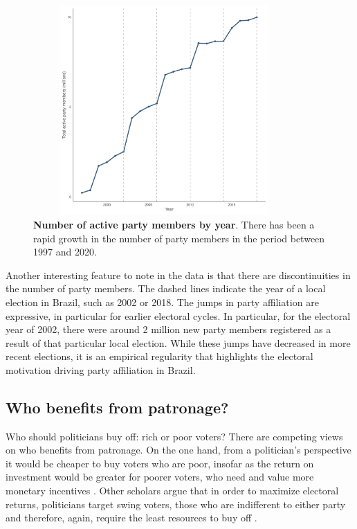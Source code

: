 \documentclass[12pt,a4paper]{article}
\begin{document}
\begin{figure}[H]
    \centering
    \includegraphics[width = 10cm, height = 8cm]{figures/partisanship/plot_partisan_by_year.pdf}
    \caption{\textbf{Number of active party members by year}. There has been a rapid growth in the number of party members in the period between 1997 and 2020.}
    \label{fig:map_pooled}
\end{figure}

Another interesting feature to note in the data is that there are discontinuities in the number of party members. The dashed lines indicate the year of a local election in Brazil, such as 2002 or 2018. The jumps in party affiliation are expressive, in particular for earlier electoral cycles. In particular, for the electoral year of 2002, there were around 2 million new party members registered as a result of that particular local election. While these jumps have decreased in more recent elections, it is an empirical regularity that highlights the electoral motivation driving party affiliation in Brazil.

\subsection{Who benefits from patronage?}

Who should politicians buy off: rich or poor voters? There are competing views on who benefits from patronage. On the one hand, from a politician's perspective it would be cheaper to buy voters who are poor, insofar as the return on investment would be greater for poorer voters, who need and value more monetary incentives \citet{stokes2013brokers}. Other scholars argue that in order to maximize electoral returns, politicians target swing voters, those who are indifferent to either party and therefore, again, require the least resources to buy off \citet{dixit1996determinants}.
\end{document}
